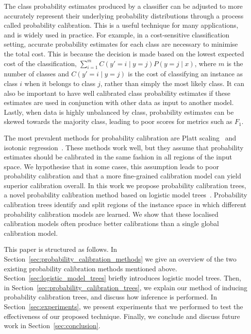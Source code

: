 \documentclass[wcp]{jmlr}
\begin{document}
The class probability estimates produced by a classifier can be adjusted to more accurately represent their underlying probability distributions through a process called probability calibration. This is a useful technique for many applications, and is widely used in practice. For example, in a cost-sensitive classification setting, accurate probability estimates for each class are necessary to minimise the total cost. This is because the decision is made based on the lowest expected cost of the classification, $\sum_{i=1}^m C(y'=i\mid y=j)P(y=j\mid x)$, where $m$ is the number of classes and $C(y'=i\mid y=j)$ is the cost of classifying an instance as class $i$ when it belongs to class $j$, rather than simply the most likely class. It can also be important to have well calibrated class probability estimates if these estimates are used in conjunction with other data as input to another model.  Lastly, when data is highly unbalanced by class, probability estimates can be skewed towards the majority class, leading to poor scores for metrics such as $F_1$.

The most prevalent methods for probability calibration are Platt scaling~\citep{platt1999probabilistic} and isotonic regression~\citep{zadrozny2001obtaining}. These methods work well, but they assume that probability estimates should be calibrated in the same fashion in all regions of the input space. We hypothesise that in some cases, this assumption leads to poor probability calibration and that a more fine-grained calibration model can yield superior calibration overall. In this work we propose probability calibration trees, a novel probability calibration method based on logistic model trees~\citep{landwehr2005logistic}. Probability calibration trees identify and split regions of the instance space in which different probability calibration models are learned. We show that these localised calibration models often produce better calibrations than a single global calibration model.

This paper is structured as follows. In Section~\ref{sec:probability_calibration_methods} we give an overview of the two existing probability calibration methods mentioned above. Section~\ref{sec:logistic_model_trees} briefly introduces logistic model trees. Then, in Section~\ref{sec:probability_calibration_trees}, we explain our method of inducing probability calibration trees, and discuss how inference is performed. In Section~\ref{sec:experiments}, we present experiments that we performed to test the effectiveness of our proposed technique. Finally, we conclude and discuss future work in Section~\ref{sec:conclusion}.
\end{document}
